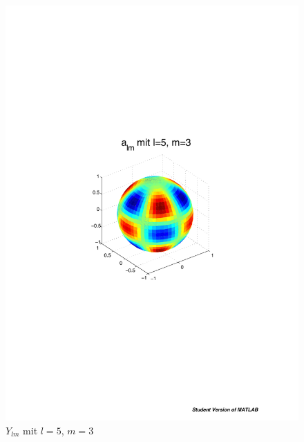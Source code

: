 \begin{refsection}
\begin{figure}
\begin{minipage}[hbt]{0.4\textwidth}
\centering
\includegraphics[width=1\textwidth]{kugel/ylm/a_5_3.pdf}
\caption{$Y_{lm}$ mit $l=5$, $m=3$}
\label{skript:ylm l=5 m=3}
\end{minipage}
\hfill
\begin{minipage}[hbt]{0.4\textwidth}
\centering

\end{minipage}
\end{figure}
\end{refsection}
